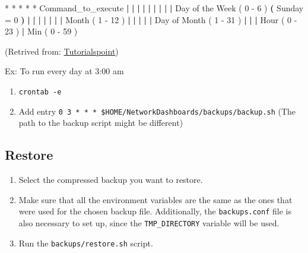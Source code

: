 \documentclass[
]{book}
\newenvironment{Shaded}{\begin{snugshade}}{\end{snugshade}}
\newcommand{\ExtensionTok}[1]{#1}
\newcommand{\KeywordTok}[1]{\textcolor[rgb]{0.13,0.29,0.53}{\textbf{#1}}}
\newcommand{\NormalTok}[1]{#1}
\begin{document}
\begin{enumerate}
\begin{Shaded}
\begin{Highlighting}[]
\ExtensionTok{*}\NormalTok{    *    *   *    *  Command\_to\_execute}
\KeywordTok{|}    \KeywordTok{|}    \KeywordTok{|}    \KeywordTok{|}   \KeywordTok{|}       
\KeywordTok{|}    \KeywordTok{|}    \KeywordTok{|}    \KeywordTok{|}    \ExtensionTok{Day}\NormalTok{ of the Week ( 0 {-} 6 ) }\KeywordTok{(} \ExtensionTok{Sunday}\NormalTok{ = 0 }\KeywordTok{)}
\KeywordTok{|}    \KeywordTok{|}    \KeywordTok{|}    \KeywordTok{|}
\KeywordTok{|}    \KeywordTok{|}    \KeywordTok{|}    \ExtensionTok{Month}\NormalTok{ ( 1 {-} 12 )}
\KeywordTok{|}    \KeywordTok{|}    \KeywordTok{|}
\KeywordTok{|}    \KeywordTok{|}    \ExtensionTok{Day}\NormalTok{ of Month ( 1 {-} 31 )}
\KeywordTok{|}    \KeywordTok{|}
\KeywordTok{|}    \ExtensionTok{Hour}\NormalTok{ ( 0 {-} 23 )}
\KeywordTok{|}
\ExtensionTok{Min}\NormalTok{ ( 0 {-} 59 ) }
\end{Highlighting}
\end{Shaded}

  (Retrived from: \href{https://www.tutorialspoint.com/unix_commands/crontab.htm}{Tutorialspoint})

  Ex: To run every day at 3:00 am

  \begin{enumerate}
  \def\labelenumii{\arabic{enumii}.}
  \item
    \texttt{crontab\ -e}
  \item
    Add entry \texttt{0\ 3\ *\ *\ *\ \$HOME/NetworkDashboards/backups/backup.sh} (The path to the backup script might be different)
  \end{enumerate}
\end{enumerate}

\hypertarget{restore}{%
\subsection*{Restore}\label{restore}}

\begin{enumerate}
\def\labelenumi{\arabic{enumi}.}
\item
  Select the compressed backup you want to restore.
\item
  Make sure that all the environment variables are the same as the ones that were used for the chosen backup file.
  Additionally, the \texttt{backups.conf} file is also necessary to set up, since the \texttt{TMP\_DIRECTORY} variable will be used.
\item
  Run the \texttt{backups/restore.sh} script.
\end{enumerate}
\end{document}
